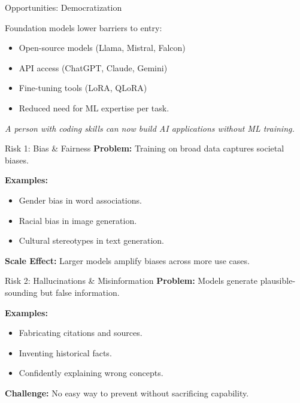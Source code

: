 \documentclass[aspectratio=169,10pt]{beamer}
\begin{document}
\begin{frame}{Opportunities: Democratization}
  \begin{tcolorbox}[hitbox, title=Access \& Democratization]
    Foundation models lower barriers to entry:
    \begin{itemize}
      \item Open-source models (Llama, Mistral, Falcon)
      \item API access (ChatGPT, Claude, Gemini)
      \item Fine-tuning tools (LoRA, QLoRA)
      \item Reduced need for ML expertise per task.
    \end{itemize}
  \end{tcolorbox}

  \vspace{0.3cm}

  \textit{A person with coding skills can now build AI applications without ML training.}
\end{frame}


\begin{frame}{Risk 1: Bias \& Fairness}
  \textbf{Problem:}
  Training on broad data captures societal biases.

  \vspace{0.3cm}

  \textbf{Examples:}
  \begin{itemize}
    \item Gender bias in word associations.
    \item Racial bias in image generation.
    \item Cultural stereotypes in text generation.
  \end{itemize}

  \vspace{0.3cm}

  \textbf{Scale Effect:} Larger models amplify biases across more use cases.
\end{frame}

\begin{frame}{Risk 2: Hallucinations \& Misinformation}
  \textbf{Problem:}
  Models generate plausible-sounding but false information.

  \vspace{0.3cm}

  \textbf{Examples:}
  \begin{itemize}
    \item Fabricating citations and sources.
    \item Inventing historical facts.
    \item Confidently explaining wrong concepts.
  \end{itemize}

  \vspace{0.3cm}

  \textbf{Challenge:} No easy way to prevent without sacrificing capability.
\end{frame}
\end{document}
